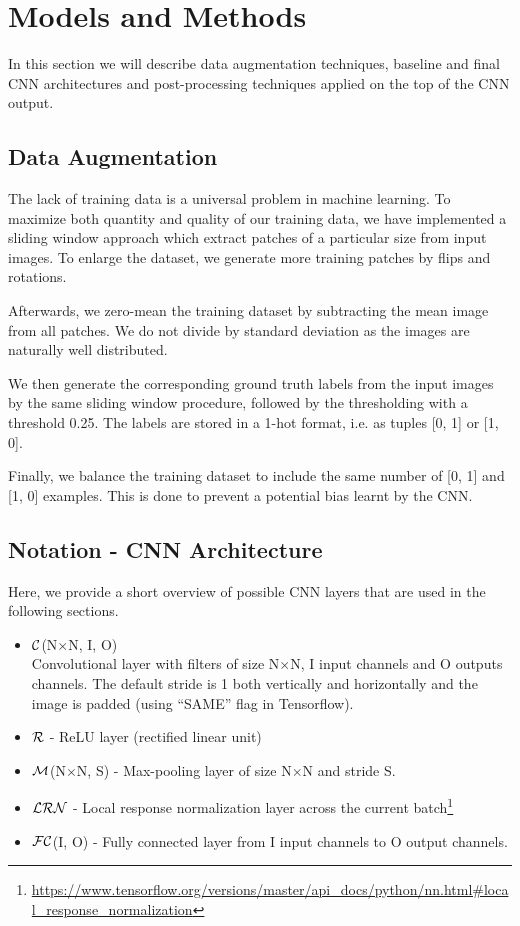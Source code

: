 \documentclass[10pt,conference,compsocconf]{IEEEtran}
\newcommand{\conv}[3]{$ \cal{C} $(#1$ \times  $#1, #2, #3)}
\newcommand{\relu}{$ \cal{R}~$}
\newcommand{\maxpool}[2]{$ \cal{M} $(#1$ \times $#1, #2)}
\newcommand{\lrn}{$ \cal{LRN}~$}
\newcommand{\fc}[2]{$ \cal{FC} $(#1, #2)}
\begin{document}
\section{Models and Methods}
\label{sec:MM}
In this section we will describe data augmentation techniques, baseline and final CNN architectures and post-processing techniques applied on the top of the CNN output.

\subsection{Data Augmentation}
\label{subsec:preprocessing}
The lack of training data is a universal problem in machine learning. To maximize both quantity and quality of our training data, we have implemented a sliding window approach which extract patches of a particular size from input images. To enlarge the dataset, we generate more training patches by flips and rotations.

Afterwards, we zero-mean the training dataset by subtracting the mean image from all patches. We do not divide by standard deviation as the images are naturally well distributed.

We then generate the corresponding ground truth labels from the input images by the same sliding window procedure, followed by the thresholding with a threshold 0.25. The labels are stored in a 1-hot format, i.e. as tuples [0, 1] or [1, 0].

Finally, we balance the training dataset to include the same number of [0, 1] and [1, 0] examples. This is done to prevent a potential bias learnt by the CNN.

\subsection{Notation - CNN Architecture}
Here, we provide a short overview of possible CNN layers that are used in the following sections.
\begin{itemize}
	\item \conv{N}{I}{O} \\
	Convolutional layer with filters of size N$ \times $N, I input channels and O outputs channels. The default stride is 1 both vertically and horizontally and the image is padded (using ``SAME'' flag in Tensorflow).
	\item \relu - ReLU layer (rectified linear unit)
	\item \maxpool{N}{S} - Max-pooling layer of size N$ \times $N and stride S.
	\item \lrn - Local response normalization layer across the current batch\footnote{\url{https://www.tensorflow.org/versions/master/api_docs/python/nn.html\#local_response_normalization}}
	\item \fc{I}{O} - Fully connected layer from I input channels to O output channels.
\end{itemize}
\end{document}
